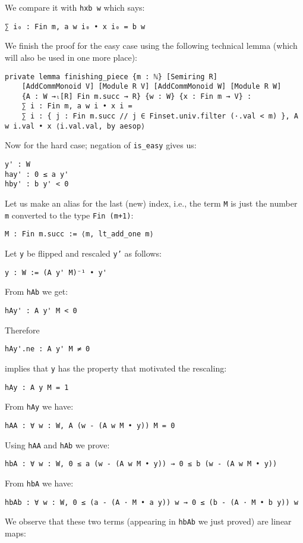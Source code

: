 \documentclass[]{article}
\renewcommand{\.}{\hskip .75pt}
\begin{document}
We compare it with \texttt{hxb w} which says:
\begin{lstlisting}
∑ i₀ : Fin m, a w i₀ • x i₀ = b w
\end{lstlisting}
We finish the proof for the easy case using the following technical lemma (which will also be used in one more place):
\begin{lstlisting}
private lemma finishing_piece {m : ℕ} [Semiring R]
    [AddCommMonoid V] [Module R V] [AddCommMonoid W] [Module R W]
    {A : W →ₗ[R] Fin m.succ → R} {w : W} {x : Fin m → V} :
    ∑ i : Fin m, a w i • x i =
    ∑ i : { j : Fin m.succ // j ∈ Finset.univ.filter (·.val < m) }, A w i.val • x ⟨i.val.val, by aesop⟩ 
\end{lstlisting}
Now for the hard case; negation of \texttt{is\_easy} gives us:
\begin{lstlisting}
y' : W
hay' : 0 ≤ a y'
hby' : b y' < 0
\end{lstlisting}
Let us make an alias for the last (new) index, i.e., the term \texttt{M} is just
the number \texttt{m} converted to the type \texttt{Fin (m+1)}:
\begin{lstlisting}
M : Fin m.succ := ⟨m, lt_add_one m⟩
\end{lstlisting}
Let \texttt{y} be flipped and rescaled \texttt{y'} as follows:
\begin{lstlisting}
y : W := (A y' M)⁻¹ • y'
\end{lstlisting}
From \texttt{hAb} we get:
\begin{lstlisting}
hAy' : A y' M < 0
\end{lstlisting}
Therefore
\begin{lstlisting}
hAy'.ne : A y' M ≠ 0
\end{lstlisting}
implies that \texttt{y} has the property that motivated the rescaling:
\begin{lstlisting}
hAy : A y M = 1
\end{lstlisting}
From \texttt{hAy} we have:
\begin{lstlisting}
hAA : ∀ w : W, A (w - (A w M • y)) M = 0
\end{lstlisting}
Using \texttt{hAA} and \texttt{hAb} we prove:
\begin{lstlisting}
hbA : ∀ w : W, 0 ≤ a (w - (A w M • y)) → 0 ≤ b (w - (A w M • y))
\end{lstlisting}
From \texttt{hbA} we have:
\begin{lstlisting}
hbAb : ∀ w : W, 0 ≤ (a - (A · M • a y)) w → 0 ≤ (b - (A · M • b y)) w
\end{lstlisting}
We observe that these two terms (appearing in \texttt{hbAb} we just proved) are linear maps:
\end{document}
